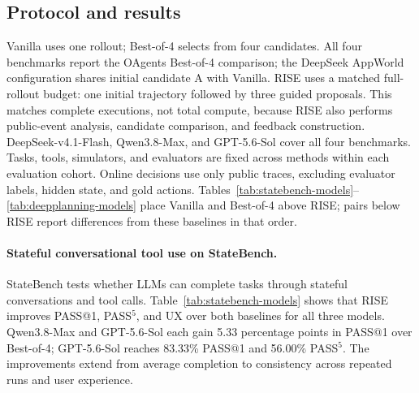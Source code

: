\documentclass{article}
\begin{document}
\subsection{Protocol and results}
Vanilla uses one rollout; Best-of-4 selects from four candidates. All four benchmarks report the OAgents Best-of-4 comparison; the DeepSeek AppWorld configuration shares initial candidate A with Vanilla. RISE uses a matched full-rollout budget: one initial trajectory followed by three guided proposals. This matches complete executions, not total compute, because RISE also performs public-event analysis, candidate comparison, and feedback construction. DeepSeek-v4.1-Flash, Qwen3.8-Max, and GPT-5.6-Sol cover all four benchmarks. Tasks, tools, simulators, and evaluators are fixed across methods within each evaluation cohort. Online decisions use only public traces, excluding evaluator labels, hidden state, and gold actions. Tables~\ref{tab:statebench-models}--\ref{tab:deepplanning-models} place Vanilla and Best-of-4 above RISE; pairs below RISE report differences from these baselines in that order.

\paragraph{Stateful conversational tool use on StateBench.} StateBench tests whether LLMs can complete tasks through stateful conversations and tool calls. Table~\ref{tab:statebench-models} shows that RISE improves PASS@1, PASS$^5$, and UX over both baselines for all three models. Qwen3.8-Max and GPT-5.6-Sol each gain 5.33 percentage points in PASS@1 over Best-of-4; GPT-5.6-Sol reaches 83.33\% PASS@1 and 56.00\% PASS$^5$. The improvements extend from average completion to consistency across repeated runs and user experience.
\end{document}
